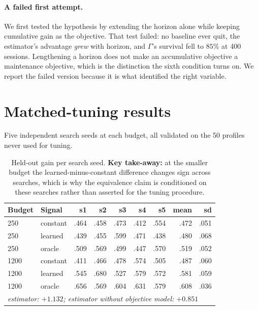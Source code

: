 \documentclass{article}
\begin{document}
\paragraph{A failed first attempt.} We first tested the hypothesis by extending the horizon alone while keeping cumulative gain as the objective. That test failed: no baseline ever quit, the estimator's advantage \emph{grew} with horizon, and $\Gamma$'s survival fell to $85\%$ at 400 sessions. Lengthening a horizon does not make an accumulative objective a maintenance objective, which is the distinction the sixth condition turns on. We report the failed version because it is what identified the right variable.

\section{Matched-tuning results}
\label{app:matchedtab}

Five independent search seeds at each budget, all validated on the 50 profiles never used for tuning.

\begin{table}[H]
  \caption{Held-out gain per search seed. \textbf{Key take-away:} at the smaller budget the learned-minus-constant difference changes sign across searches, which is why the equivalence claim is conditioned on these searches rather than asserted for the tuning procedure.}
  \label{tab:matched}
  \centering\small
  \begin{tabular}{llrrrrrrr}
    \toprule
    Budget & Signal & s1 & s2 & s3 & s4 & s5 & mean & sd \\
    \midrule
    250  & constant & .464 & .458 & .473 & .412 & .554 & .472 & .051 \\
    250  & learned  & .439 & .455 & .599 & .471 & .438 & .480 & .068 \\
    250  & oracle   & .509 & .569 & .499 & .447 & .570 & .519 & .052 \\
    \midrule
    1200 & constant & .411 & .466 & .478 & .574 & .505 & .487 & .060 \\
    1200 & learned  & .545 & .680 & .527 & .579 & .572 & .581 & .059 \\
    1200 & oracle   & .656 & .569 & .604 & .631 & .579 & .608 & .036 \\
    \midrule
    \multicolumn{9}{l}{\emph{estimator: $+1.132$; estimator without objective model: $+0.851$}} \\
    \bottomrule
  \end{tabular}
\end{table}
\end{document}
